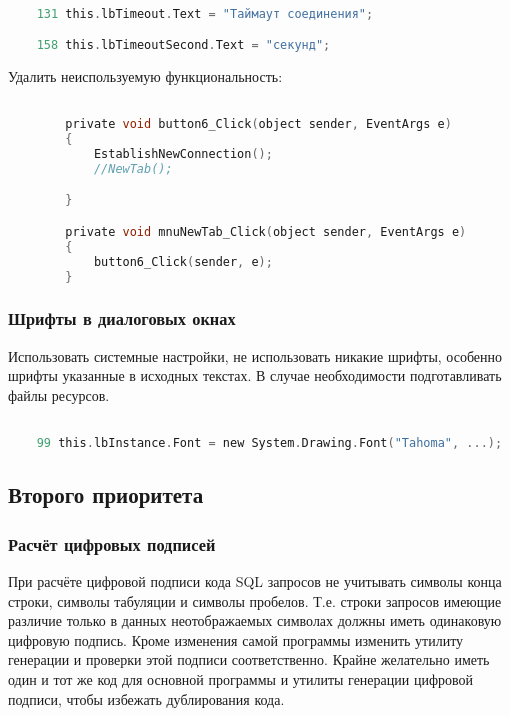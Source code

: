 \begin{lstlisting}[language=C,label=Labels:frmSettings.Designer.cs,caption=frmSettings.Designer.cs]

	131 this.lbTimeout.Text = "Таймаут соединения";

	158 this.lbTimeoutSecond.Text = "секунд";

\end{lstlisting}

Удалить неиспользуемую функциональность:

\begin{lstlisting}[language=C,label=frmMain.cs,caption=frmMain.cs]

        private void button6_Click(object sender, EventArgs e)
        {
            EstablishNewConnection();
            //NewTab();

        }

        private void mnuNewTab_Click(object sender, EventArgs e)
        {
            button6_Click(sender, e);
        }

\end{lstlisting}

\subsubsection{Шрифты в диалоговых окнах}

Использовать системные настройки, не использовать никакие шрифты, особенно шрифты указанные в
исходных текстах. В случае необходимости подготавливать файлы ресурсов.

\begin{lstlisting}[language=C,label=Fonts:frmErrorLog.Designer.cs,caption=frmErrorLog.Designer.cs]

	99 this.lbInstance.Font = new System.Drawing.Font("Tahoma", ...);

\end{lstlisting}

\subsection{Второго приоритета}

\subsubsection{Расчёт цифровых подписей}

При расчёте цифровой подписи кода SQL запросов не учитывать символы конца строки, символы табуляции
и символы пробелов. Т.е. строки запросов имеющие различие только в данных неотображаемых символах
должны иметь одинаковую цифровую подпись. Кроме изменения самой программы изменить утилиту генерации
и проверки этой подписи соответственно. Крайне желательно иметь один и тот же код для основной
программы и утилиты генерации цифровой подписи, чтобы избежать дублирования кода.

